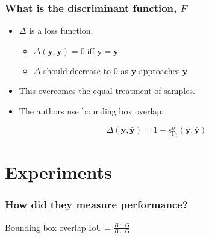 \documentclass[mathserif,handout]{beamer}
\begin{document}
\begin{frame}
    \frametitle{What is the discriminant function, $F$}
    \begin{itemize}
        \item $\Delta$ is a loss function.
            \begin{itemize}
                \item $\Delta (\mathbf{y}, \mathbf{\bar{y}}) = 0 \; \text{iff} \; \mathbf{y} = \mathbf{\bar{y}}$
                \item $\Delta$ should decrease to 0 as $\mathbf{y}$ approaches $\mathbf{\bar{y}}$
            \end{itemize}
        \item This overcomes the equal treatment of samples.
        \item The authors use bounding box overlap:
    \end{itemize}
    \begin{equation}
        \Delta(\mathbf{y}, \mathbf{\bar{y}}) = 1 - s_{\mathbf{p}_t}^o (\mathbf{y}, \mathbf{\bar{y}})
    \end{equation}
\end{frame}


\section{Experiments}

\begin{frame}
    \frametitle{How did they measure performance?}
    \begin{block}{Bounding box overlap}
        $\text{IoU} = \frac{B \cap G}{B \cup G}$
    \end{block}
\end{frame}
\end{document}
